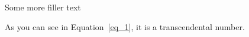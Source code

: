 

\usepackage{lipsum}



\begin{cheat}

\lipsum[1-1]
Some more filler text
\lipsum[2-2]


As you can see in Equation~\ref{eq_1}, it is a transcendental number.
\lipsum[3-100]
\end{cheat}


